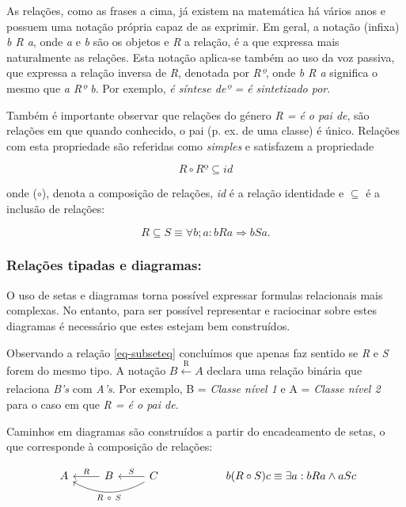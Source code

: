 \documentclass[tikz,runningheads,a4paper]{llncs}
\begin{document}
As relações, como as frases a cima, já existem na matemática há vários anos e possuem uma notação própria capaz de as exprimir. Em geral, a notação (infixa) \textit{b R a}, onde \textit{a} e \textit{b} são os objetos e \textit{R} a relação, é a que expressa mais naturalmente as relações. Esta notação aplica-se também ao uso da voz passiva, que expressa a relação inversa de \textit{R}, denotada por \textit{Rº}, onde \textit{b R a} significa o mesmo que \textit{a Rº b}. Por exemplo, \textit{é síntese deº = é sintetizado por}.\label{rel_inv}

Também é importante observar que relações do género \textit{R = é o pai de}, são relações em que quando conhecido, o pai (p. ex. de uma classe) é único. Relações com esta propriedade são referidas como \textit{simples} e satisfazem a propriedade

\begin{equation}
\label{eq-simple}
R \circ Rº \subseteq id
\end{equation}

\noindent onde ($\circ$), denota a composição de relações, \textit{id} é a relação identidade e $\subseteq$ é a inclusão de relações:

\begin{equation}
\label{eq-subseteq}
R \subseteq S \equiv \forall b; a : b R a \Rightarrow b S a.
\end{equation}

\subsubsection{Relações tipadas e diagramas:}

O uso de setas e diagramas torna possível expressar formulas relacionais mais complexas. No entanto, para ser possível representar e raciocinar sobre estes diagramas é necessário que estes estejam bem construídos.

Observando a relação \eqref{eq-subseteq} concluímos que apenas faz sentido se \textit{R} e \textit{S} forem do mesmo tipo. A notação $B \xleftarrow[]{\text{R}} A$ declara uma relação binária que relaciona \textit{B's} com \textit{A's}. Por exemplo, B = \textit{Classe nível 1} e A = \textit{Classe nível 2} para o caso em que \textit{R = é o pai de}. 

Caminhos em diagramas são construídos a partir do encadeamento de setas, o que corresponde à composição de relações:

\begin{equation}
\label{eq-composition}
\begin{tikzcd}
A \arrow[bend right, leftarrow, swap]{rr}{R\ \circ\ S} \arrow[leftarrow]{r}{R} & B \arrow[leftarrow]{r}{S} & C
\end{tikzcd}
\hskip2cm b (R \circ S) c \equiv \exists a: b R a \land a S c
\end{equation}
\end{document}
